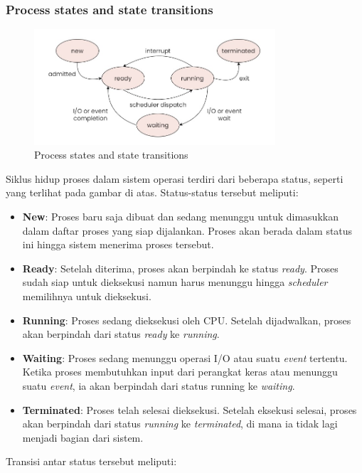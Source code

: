 \documentclass[12pt]{article}
\begin{document}
\subsubsection{Process states and state transitions}
\begin{figure}[h]
\centering
\includegraphics[width=0.8\textwidth]{asset/process-state.jpg}
\caption{Process states and state transitions}
\label{fig:process_state}
\end{figure}
\noindent Siklus hidup proses dalam sistem operasi terdiri dari beberapa status, seperti yang terlihat pada gambar di atas. Status-status tersebut meliputi:
\begin{itemize}
    \item \textbf{New}: Proses baru saja dibuat dan sedang menunggu  untuk dimasukkan dalam daftar proses yang siap dijalankan. Proses akan berada dalam status ini hingga sistem menerima proses tersebut.
    \item \textbf{Ready}: Setelah diterima, proses akan berpindah ke status \textit{ready}. Proses sudah siap untuk dieksekusi namun harus menunggu hingga \textit{scheduler} memilihnya untuk dieksekusi.
    \item \textbf{Running}: Proses sedang dieksekusi oleh CPU. Setelah dijadwalkan, proses akan berpindah dari status \textit{ready} ke \textit{running}.
    \item \textbf{Waiting}: Proses sedang menunggu operasi I/O atau suatu \textit{event} tertentu. Ketika proses membutuhkan input dari perangkat keras atau menunggu suatu \textit{event}, ia akan berpindah dari status running ke \textit{waiting}.
    \item \textbf{Terminated}: Proses telah selesai dieksekusi. Setelah eksekusi selesai, proses akan berpindah dari status \textit{running} ke \textit{terminated}, di mana ia tidak lagi menjadi bagian dari sistem.
\end{itemize}
Transisi antar status tersebut meliputi:
\end{document}
